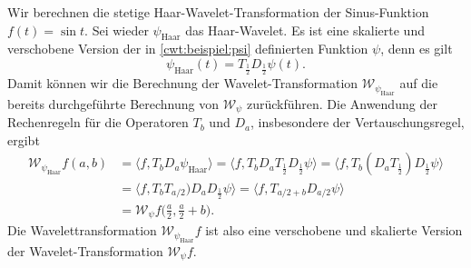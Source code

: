 \begin{beispiel}
Wir berechnen die stetige Haar-Wavelet-Transformation der Sinus-Funktion
$f(t)=\sin t$.
Sei wieder $\psi_{\text{Haar}}$ das Haar-Wavelet.
Es ist eine skalierte und verschobene Version der in
\eqref{cwt:beispiel:psi} definierten Funktion $\psi$, denn es gilt
\[
\psi_{\text{Haar}}(t) = T_{\frac12}D_{\frac12}\psi(t).
\]
Damit können wir die Berechnung der Wavelet-Transformation
$\mathcal{W}_{\psi_{\text{Haar}}}$ auf die bereits durchgeführte
Berechnung von $\mathcal{W}_{\psi}$ zurückführen.
Die Anwendung der Rechenregeln für die Operatoren $T_b$ und $D_a$,
insbesondere der Vertauschungsregel, ergibt
\begin{align*}
\mathcal{W}_{\psi_{\text{Haar}}}f(a,b)
&=
\langle f, T_bD_a\psi_{\text{Haar}}\rangle
=
\langle f, T_bD_aT_{\frac12}D_{\frac12}\psi\rangle
=
\langle f, T_b(D_aT_{\frac12})D_{\frac12}\psi\rangle
\\
&=
\langle f, T_bT_{a/2})D_aD_{\frac12}\psi\rangle
=
\langle f, T_{a/2+b}D_{a/2}\psi\rangle
\\
&=
\mathcal{W}_{\psi}f\biggl(\frac{a}2,\frac{a}2+b\biggr).
\end{align*}
Die Wavelettransformation $\mathcal{W}_{\psi_{\text{Haar}}}f$ ist also
eine verschobene und skalierte Version der Wavelet-Transformation 
$\mathcal{W}_{\psi}f$.
\end{beispiel}

